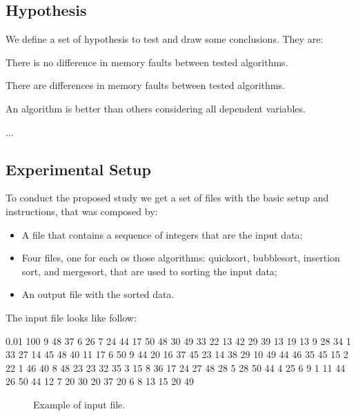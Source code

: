 \subsection{Hypothesis}

We define a set of hypothesis to test and draw some conclusions. They are:

\setcounter{hyp}{-1}
\begin{hyp} \label{hyp:a}There is no difference in memory faults between tested algorithms.\end{hyp}
\begin{hyp} \label{hyp:b}There are differences in memory faults between tested algorithms. \end{hyp}
\begin{hyp} \label{hyp:c} An algorithm is better than others considering all dependent variables. \end{hyp}

\begin{hyp} \label{hyp:d} ... \end{hyp}

\subsection{Experimental Setup}

To conduct the proposed study we get a set of files with the basic setup and instructions, that was composed by:
\begin{itemize}
    \item A file that contains a sequence of integers that are the input data;
    \item Four files, one for each os those algorithms: quicksort, bubblesort, insertion sort, and mergesort, that are used to sorting the input data;
    \item An output file with the sorted data.
\end{itemize}

The input file looks like follow:

\begin{verbbox}[\mbox{}]
0.01 100 9 48 37 6 26 7 24 44 17 50 48 30 49 33 22 13 42 29 39 13 19 13 9 28 
34 1 33 27 14 45 48 40 11 17 6 50 9 44 20 16 37 45 23 14 38 29 10 49 44 46 35
45 15 2 22 1 46 40 8 48 23 23 32 35 3 15 8 36 17 24 27 48 28 5 28 50 44 4 25 
6 9 1 11 44 26 50 44 12 7 20 30 20 37 20 6 8 13 15 20 49
\end{verbbox}

\begin{figure}[H]
    \centering
    \fbox{
    \theverbbox
    }
    \caption{Example of input file.}
    \label{fig-input-file-example}
\end{figure}

